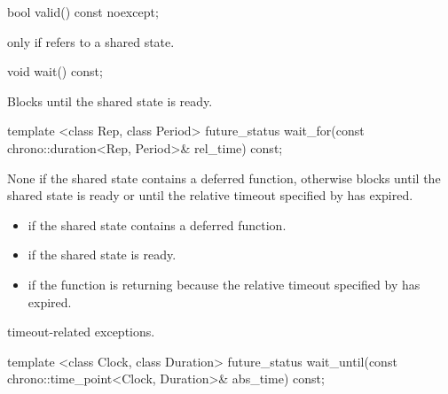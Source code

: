%
\begin{itemdecl}
bool valid() const noexcept;
\end{itemdecl}

\begin{itemdescr}
\pnum
\returns {} only if  refers to a shared state.
\end{itemdescr}

%
\begin{itemdecl}
void wait() const;
\end{itemdecl}

\begin{itemdescr}
\pnum
\effects
Blocks until the shared state is ready.
\end{itemdescr}

%
\begin{itemdecl}
template <class Rep, class Period>
  future_status wait_for(const chrono::duration<Rep, Period>& rel_time) const;
\end{itemdecl}

\begin{itemdescr}
\pnum
\effects
None if the shared state contains a deferred function,
otherwise
blocks until the shared state is ready or until
the relative timeout specified by
 has expired.

\pnum
\returns

\begin{itemize}
\item {} if the shared state contains a deferred
function.

\item {} if the shared state is ready.

\item {} if the function is returning because the
relative timeout
specified by  has expired.
\end{itemize}

\pnum
\throws
timeout-related exceptions.
\end{itemdescr}

%
\begin{itemdecl}
template <class Clock, class Duration>
  future_status wait_until(const chrono::time_point<Clock, Duration>& abs_time) const;
\end{itemdecl}

